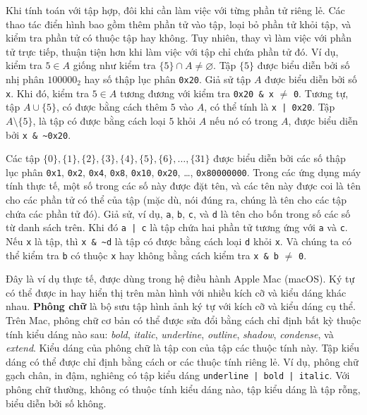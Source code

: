 Khi tính toán với tập hợp, đôi khi cần làm việc với từng phần tử riêng lẻ. Các thao tác điển hình bao gồm thêm phần tử vào tập, loại bỏ phần tử khỏi tập, và kiểm tra phần tử có thuộc tập hay không. Tuy nhiên, thay vì làm việc với phần tử trực tiếp, thuận tiện hơn khi làm việc với tập chỉ chứa phần tử đó. Ví dụ, kiểm tra $5 \in A$ giống như kiểm tra $\{5\} \cap A \neq \varnothing$. Tập $\{5\}$ được biểu diễn bởi số nhị phân $100000_2$ hay số thập lục phân \texttt{0x20}. Giả sử tập $A$ được biểu diễn bởi số \texttt{x}. Khi đó, kiểm tra $5 \in A$ tương đương với kiểm tra \texttt{0x20 \& x} $\neq$ \texttt{0}. Tương tự, tập $A \cup \{5\}$, có được bằng cách thêm $5$ vào $A$, có thể tính là \texttt{x | 0x20}. Tập $A \setminus \{5\}$, là tập có được bằng cách loại $5$ khỏi $A$ nếu nó có trong $A$, được biểu diễn bởi \texttt{x \& \~{}0x20}.

Các tập $\{0\}, \{1\}, \{2\}, \{3\}, \{4\}, \{5\}, \{6\}, \ldots, \{31\}$ được biểu diễn bởi các số thập lục phân \texttt{0x1}, \texttt{0x2}, \texttt{0x4}, \texttt{0x8}, \texttt{0x10}, \texttt{0x20}, \ldots, \texttt{0x80000000}. Trong các ứng dụng máy tính thực tế, một số trong các số này được đặt tên, và các tên này được coi là tên cho các phần tử có thể của tập (mặc dù, nói đúng ra, chúng là tên cho các tập chứa các phần tử đó). Giả sử, ví dụ, \texttt{a}, \texttt{b}, \texttt{c}, và \texttt{d} là tên cho bốn trong số các số từ danh sách trên. Khi đó \texttt{a | c} là tập chứa hai phần tử tương ứng với \texttt{a} và \texttt{c}. Nếu \texttt{x} là tập, thì \texttt{x \& \~{}d} là tập có được bằng cách loại \texttt{d} khỏi \texttt{x}. Và chúng ta có thể kiểm tra \texttt{b} có thuộc \texttt{x} hay không bằng cách kiểm tra \texttt{x \& b} $\neq$ \texttt{0}.

Đây là ví dụ thực tế, được dùng trong hệ điều hành Apple Mac (macOS). Ký tự có thể được in hay hiển thị trên màn hình với nhiều kích cỡ và kiểu dáng khác nhau. \textbf{Phông chữ} là bộ sưu tập hình ảnh ký tự với kích cỡ và kiểu dáng cụ thể. Trên Mac, phông chữ cơ bản có thể được sửa đổi bằng cách chỉ định bất kỳ thuộc tính kiểu dáng nào sau: \textit{bold}, \textit{italic}, \textit{underline}, \textit{outline}, \textit{shadow}, \textit{condense}, và \textit{extend}. Kiểu dáng của phông chữ là tập con của tập các thuộc tính này. Tập kiểu dáng có thể được chỉ định bằng cách or các thuộc tính riêng lẻ. Ví dụ, phông chữ gạch chân, in đậm, nghiêng có tập kiểu dáng \texttt{underline | bold | italic}. Với phông chữ thường, không có thuộc tính kiểu dáng nào, tập kiểu dáng là tập rỗng, biểu diễn bởi số không.

